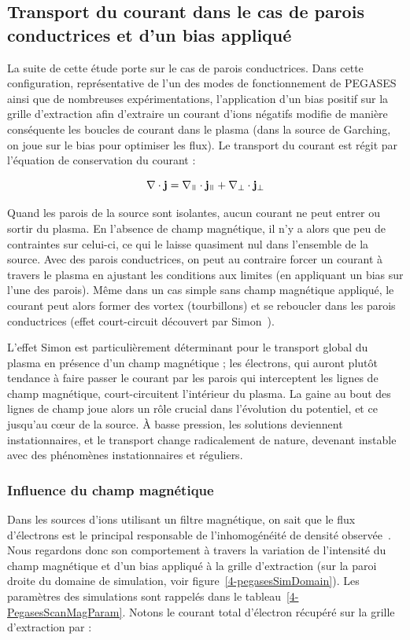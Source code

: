 \begin{refsection}
\subsection{Transport du courant dans le cas de parois conductrices et d'un bias
appliqué}

La suite de cette étude porte sur le cas de parois
conductrices. Dans cette configuration, représentative de
l'un des modes de fonctionnement de PEGASES ainsi que de nombreuses
expérimentations, l'application d'un bias positif sur la grille d'extraction afin d'extraire un
courant d'ions négatifs modifie de manière conséquente les boucles de
courant dans le plasma (dans la source de Garching, on joue sur le bias pour
optimiser les flux). Le transport du courant est régit par l'équation de
conservation du courant :

\begin{equation}
\nabla\cdot\mathbf j=\nabla_\para\cdot \mathbf j_\para +\nabla_\perp\cdot
\mathbf j_\perp
\end{equation}

Quand les parois de la source sont
isolantes, aucun courant ne peut entrer ou sortir du plasma. En l'absence de
champ magnétique, il n'y a alors que peu de contraintes sur celui-ci, ce qui le
laisse quasiment nul dans l'ensemble de la source. Avec des parois conductrices,
on peut au contraire forcer un courant à travers le plasma en ajustant les
conditions aux limites (en appliquant un bias sur l'une des parois).
Même dans un cas simple sans champ magnétique appliqué, le courant peut alors
former des vortex (tourbillons) et se reboucler dans les parois
conductrices (effet court-circuit découvert par Simon~\parencite{Simon55}).

L'effet Simon est particulièrement déterminant pour le transport
global du plasma en présence d'un champ magnétique ; les électrons, qui auront plutôt
tendance à faire passer le courant par les parois qui
interceptent les lignes de champ magnétique, court-circuitent l'intérieur du
plasma. La gaine au bout des lignes de champ joue alors un rôle crucial dans
l'évolution du potentiel, et ce jusqu'au c\oe{}ur de la source. À basse
pression, les solutions deviennent instationnaires, et le transport change
radicalement de nature, devenant instable avec des phénomènes instationnaires
et réguliers.
	
\subsubsection{Influence du champ magnétique}
Dans les sources d'ions utilisant un filtre magnétique, on sait que le flux
d'électrons est le principal responsable de l'inhomogénéité
de densité observée~\parencite{PIC2D,PIC3D}. Nous regardons donc son
comportement à travers la variation de l'intensité du champ magnétique et d'un
bias appliqué à la grille d'extraction (sur la paroi droite du domaine de
simulation, voir figure~\ref{4-pegasesSimDomain}).
Les paramètres des simulations sont rappelés dans le tableau~\ref{4-PegasesScanMagParam}.
Notons le courant total d'électron récupéré sur la grille d'extraction par :


\end{refsection}
